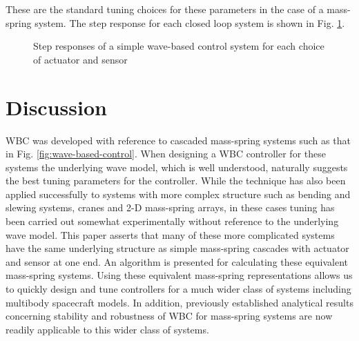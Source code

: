 \documentclass{mbd_fullpaper}
\begin{document}
These are the standard tuning choices for these parameters in the case of a mass-spring system.
The step response for each closed loop system is shown in Fig. \ref{fig:graphs}.
\begin{figure}[H]
  \begin{center}
    \subfigure[]{ \label{fig:graphdel}}   
    \subfigure[]{ \label{fig:graphf2}}
	\subfigure[]{ \label{fig:graphf3}}
    \caption{Step responses of a simple wave-based control system for each choice of actuator and sensor \label{fig:graphs}}
  \end{center}
\end{figure}

\section{Discussion}
\label{sec:discussion}
WBC was developed with reference to cascaded mass-spring systems such as that in Fig. \ref{fig:wave-based-control}.
When designing a WBC controller for these systems the underlying wave model, which is well understood, naturally suggests the best tuning parameters for the controller.
While the technique has also been applied successfully to systems with more complex structure such as bending and slewing systems, cranes and 2-D mass-spring arrays, in these cases tuning has been carried out somewhat experimentally without reference to the underlying wave model.
This paper asserts that many of these more complicated systems have the same underlying structure as simple mass-spring cascades with actuator and sensor at one end.
An algorithm is presented for calculating these equivalent mass-spring systems.
Using these equivalent mass-spring representations allows us to quickly design and tune controllers for a much wider class of systems including multibody spacecraft models.
In addition, previously established analytical results concerning stability and robustness of WBC for mass-spring systems are now readily applicable to this wider class of systems.
\end{document}
